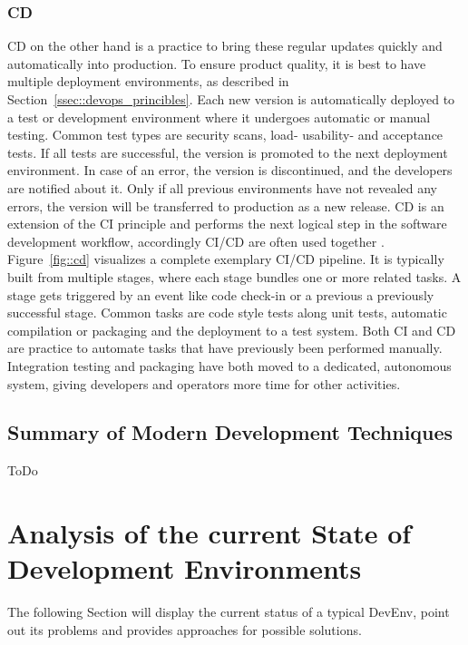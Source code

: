 \documentclass[12pt, a4paper]{article}
\begin{document}
    \subsubsection{\acl{CD}}
    \acl{CD} on the other hand is a practice to bring these regular updates quickly and automatically into production. To ensure product quality, it is best to have multiple deployment environments, as described in Section~\ref{ssec::devops_princibles}. Each new version is automatically deployed to a test or development environment where it undergoes automatic or manual testing. Common test types are security scans, load- usability- and acceptance tests. If all tests are successful, the version is promoted to the next deployment environment. In case of an error, the version is discontinued, and the developers are notified about it. Only if all previous environments have not revealed any errors, the version will be transferred to production as a new release. \ac{CD} is an extension of the \ac{CI} principle and performs the next logical step in the software development workflow, accordingly \ac{CI}/\ac{CD} are often used together \cite{azuredevops}.\newline
    Figure~\ref{fig::cd} visualizes a complete exemplary \ac{CI}/\ac{CD} pipeline. It is typically built from multiple stages, where each stage bundles one or more related tasks. A stage gets triggered by an event like code check-in or a previous a previously successful stage. Common tasks are code style tests along unit tests, automatic compilation or packaging and the deployment to a test system.\newline
    Both \ac{CI} and \ac{CD} are practice to automate tasks that have previously been performed manually. Integration testing and packaging have both moved to a dedicated, autonomous system, giving developers and operators more time for other activities.
    
    \subsection{Summary of Modern Development Techniques}
    ToDo
    \newpage

\section{Analysis of the current State of Development Environments}\label{sec::problem}
The following Section will display the current status of a typical \ac{DevEnv}, point out its problems and provides approaches for possible solutions.
\end{document}
